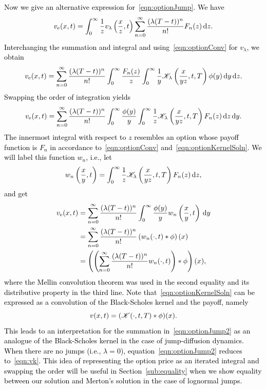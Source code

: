 \textcolor{black}{
Now we give an alternative expression for~\eqref{eqn:optionJump}. We have
	$$
		v_\text{e}(x,t) = \int_0^\infty \frac{1}{z} v_\lambda\left( \frac{x}{z},t \right)\displaystyle\sum\limits_{n=0}^\infty \frac{(\lambda(T-t))^n}{n!}F_n(z) \, \mathrm d z.
	$$
Interchanging the summation and integral and using~\eqref{eqn:optionConv} for $v_\lambda$, we obtain
	$$
		v_\text{e}(x,t) = \displaystyle\sum\limits_{n=0}^\infty\frac{(\lambda(T-t))^n}{n!}\int_0^\infty \frac{F_n(z)}{z}\int_0^\infty \frac{1}{y} \mathscr K_\lambda\left( \frac{x}{yz}, t, T \right) \phi(y) \, \mathrm d y \, \mathrm d z.
	$$
Swapping the order of integration yields
	$$
		v_\text{e}(x,t) = \displaystyle\sum\limits_{n=0}^\infty\frac{(\lambda(T-t))^n}{n!}\int_0^\infty \frac{\phi(y)}{y}\int_0^\infty \frac{1}{z} \mathscr K_\lambda\left( \frac{x}{yz}, t, T \right)F_n(z) \, \mathrm d z \, \mathrm d y.
	$$
The innermost integral with respect to $z$ resembles an option whose payoff function is $F_n$ in accordance to~\eqref{eqn:optionConv} and~\eqref{eqn:optionKernelSoln}. We will label this function $w_n$, i.e., let
	$$
		w_n\left(\frac{x}{y},t\right) = \int_0^\infty \frac{1}{z} \mathscr K_\lambda\left( \frac{x}{yz},t,T \right) F_n(z) \, \mathrm d z,
	$$ and get
	\begin{equation}
	\label{eqn:optionJump2}
	\begin{split}
		v_\text{e}(x,t) &= \displaystyle\sum\limits_{n=0}^\infty\frac{(\lambda(T-t))^n}{n!}\int_0^\infty \frac{\phi(y)}{y}w_n\left( \frac{x}{y}, t \right) \, \mathrm d y \\
		&= \displaystyle\sum\limits_{n=0}^\infty\frac{(\lambda(T-t))^n}{n!}\left( w_n(\cdot, t) \ast \phi \right)(x) \\
		&= \left( \left( \displaystyle\sum\limits_{n=0}^\infty\frac{(\lambda(T-t))^n}{n!}w_n(\cdot,t)\right)   \ast \phi \right)(x),
	\end{split}
	\end{equation}
where the Mellin convolution theorem was used in the second equality and its distributive property in the third line. Note that~\eqref{eqn:optionKernelSoln} can be expressed as a convolution of the Black-Scholes kernel and the payoff, namely
	\begin{equation}
		\label{eqn:vk}
		v(x,t) = (\mathscr K(\cdot,t,T) \ast \phi)(x).
	\end{equation}
	This leads to an interpretation for the summation in~\eqref{eqn:optionJump2} as an analogue of the Black-Scholes kernel in the case of jump-diffusion dynamics. When there are no jumps (i.e., $\lambda = 0$), equation~\eqref{eqn:optionJump2} reduces to~\eqref{eqn:vk}. This idea of representing the option price as an iterated integral and swapping the order will be useful in Section~\ref{sub:equality} when we show equality between our solution and Merton's solution in the case of lognormal jumps.
}

